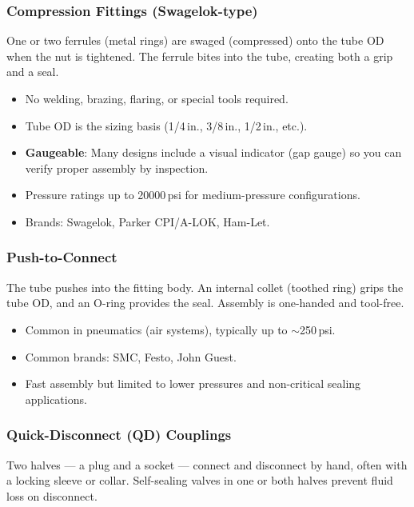 \documentclass[11pt,letterpaper,twoside,openany]{book}
\begin{document}
\subsubsection{Compression Fittings (Swagelok-type)}

One or two ferrules (metal rings) are swaged (compressed) onto the tube OD when the nut is tightened. The ferrule bites into the tube, creating both a grip and a seal.

\begin{itemize}[nosep,leftmargin=1.5em]
  \item No welding, brazing, flaring, or special tools required.
  \item Tube OD is the sizing basis (1/4\,in., 3/8\,in., 1/2\,in., etc.).
  \item \textbf{Gaugeable}: Many designs include a visual indicator (gap gauge) so you can verify proper assembly by inspection.
  \item Pressure ratings up to 20000\,psi for medium-pressure configurations.
  \item Brands: Swagelok, Parker CPI/A-LOK, Ham-Let.
\end{itemize}

\subsubsection{Push-to-Connect}

The tube pushes into the fitting body. An internal collet (toothed ring) grips the tube OD, and an O-ring provides the seal. Assembly is one-handed and tool-free.

\begin{itemize}[nosep,leftmargin=1.5em]
  \item Common in pneumatics (air systems), typically up to $\sim$250\,psi.
  \item Common brands: SMC, Festo, John Guest.
  \item Fast assembly but limited to lower pressures and non-critical sealing applications.
\end{itemize}

\subsubsection{Quick-Disconnect (QD) Couplings}

Two halves --- a plug and a socket --- connect and disconnect by hand, often with a locking sleeve or collar. Self-sealing valves in one or both halves prevent fluid loss on disconnect.
\end{document}
